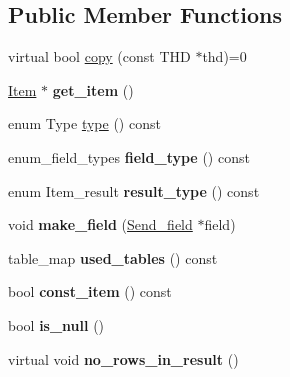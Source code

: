 \subsection*{Public Member Functions}
\begin{DoxyCompactItemize}
\item 
virtual bool \mbox{\hyperlink{classItem__copy_a575caec22eeb27fb76d5aa74b1a8d492}{copy}} (const T\+HD $\ast$thd)=0
\item 
\mbox{\label{classItem__copy_a8f6f844bee525849fdb24cf8d2d71142}} 
\mbox{\hyperlink{classItem}{Item}} $\ast$ {\bfseries get\+\_\+item} ()
\item 
enum Type \mbox{\hyperlink{classItem__copy_a45b09a8da9a70f34540347eba70ace32}{type}} () const
\item 
\mbox{\label{classItem__copy_a9748f715a7860248027b46db23e78be4}} 
enum\+\_\+field\+\_\+types {\bfseries field\+\_\+type} () const
\item 
\mbox{\label{classItem__copy_a4c288534e8f46b1f281f5606193b72ca}} 
enum Item\+\_\+result {\bfseries result\+\_\+type} () const
\item 
\mbox{\label{classItem__copy_a5cf4a9b6d1b21b21da9ace7bb20b5705}} 
void {\bfseries make\+\_\+field} (\mbox{\hyperlink{classSend__field}{Send\+\_\+field}} $\ast$field)
\item 
\mbox{\label{classItem__copy_a72669f7243c14a33255b3b7d2ceb9850}} 
table\+\_\+map {\bfseries used\+\_\+tables} () const
\item 
\mbox{\label{classItem__copy_adfe30d6b40b64fb118233e928fabf648}} 
bool {\bfseries const\+\_\+item} () const
\item 
\mbox{\label{classItem__copy_a1857f005b3c8ddc71251c4acf76f4547}} 
bool {\bfseries is\+\_\+null} ()
\item 
\mbox{\label{classItem__copy_a66e498d21705e421ad4a04132111fc01}} 
virtual void {\bfseries no\+\_\+rows\+\_\+in\+\_\+result} ()
\item 
\mbox{\label{classItem__copy_a7eafd69655e91b4a77c4184c05b6e06b}} 

\end{DoxyCompactItemize}
